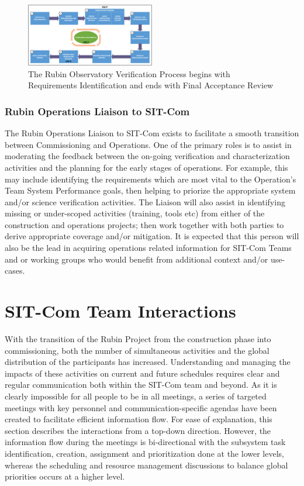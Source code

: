 \documentclass[SE,lsstdraft,authoryear,toc]{lsstdoc}
\begin{document}
\begin{figure}[h]
    \centering
    \includegraphics[width=0.5\textwidth]{static/verification_process}
    \caption{The Rubin Observatory Verification Process begins with Requirements Identification and ends with Final Acceptance Review}
    \label{fig:verification_process}
\end{figure}


\subsubsection{Rubin Operations Liaison to SIT-Com}
\label{sec:SCLT_liason_to_ops}

The Rubin Operations Liaison to SIT-Com exists to facilitate a smooth transition between Commissioning and Operations.
One of the primary roles is to assist in moderating the feedback between the on-going verification and characterization activities and the planning for the early stages of operations.
For example, this may include identifying the requirements which are most vital to the Operation's Team System Performance goals, then helping to priorize the appropriate system and/or science verification activities.
The Liaison will also assist in identifying missing or under-scoped activities (training, tools etc) from either of the construction and operations projects; then work together with both parties to derive appropriate coverage and/or mitigation.
It is expected that this person will also be the lead in acquiring operations related information for SIT-Com Teams and or working groups who would benefit from additional context and/or use-cases.

\section{SIT-Com Team Interactions}
\label{sec:interactions}
With the transition of the Rubin Project from the construction phase into commissioning, both the number of simultaneous activities and the global distribution of the participants has increased.
Understanding and managing the impacts of these activities on current and future schedules requires clear and regular communication both within the SIT-Com team and beyond.
As it is clearly impossible for all people to be in all meetings, a series of targeted meetings with key personnel and communication-specific agendas have been created to facilitate efficient information flow.
For ease of explanation, this section describes the interactions from a top-down direction.
However, the information flow during the meetings is bi-directional with the subsystem task identification, creation, assignment and prioritization done at the lower levels, whereas the scheduling and resource management discussions to balance global priorities occurs at a higher level.
\end{document}
